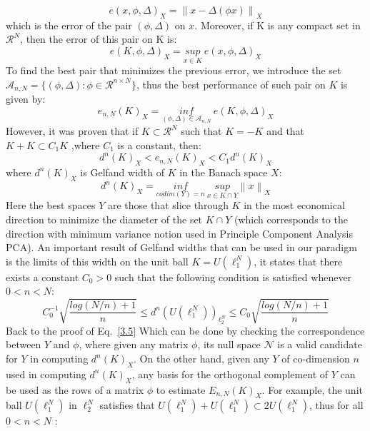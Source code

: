 \begin{equation}
    e(x,\phi,\Delta)_X=\left\| x-\Delta(\phi x)\right\|_X
\end{equation}
which is the error of the pair $(\phi, \Delta)$ on $x$. Moreover, if K is any compact set in $\mathcal{R}^N$, then the error of this pair on K is:
\begin{equation}
    e(K,\phi,\Delta)_X = \underset{x\in K}{sup} ~e(x,\phi,\Delta)_X
\end{equation}
To find the best pair that minimizes the previous error, we introduce the set $\mathcal{A}_{n,N}=\{(\phi, \Delta ): \phi \in \mathcal{R}^{n\times N}\}$, thus the best performance of such pair on $K$ is given by: 
\begin{equation}
e_{n,N}(K)_X= \underset{(\phi, \Delta)\in \mathcal{A}_{n,N}}{inf}~e(K,\phi,\Delta)_X
\end{equation}
However, it was proven that if $K\subset \mathcal{R}^N$ such that $K=-K$ and that $K+K\subset C_1K$ ,where $C_1$ is a constant, then\citep{concentration_kashin}:
\begin{equation}
\label{3.5}
   d^n(K)_X < e_{n,N}(K)_X<C_1d^n(K)_X
\end{equation}
where $d^n(K)_X$ is Gelfand width of $K$ in the Banach space $X$:
\begin{equation}
    d^n(K)_X= \underset{codim(Y)=n}{inf}~\underset{x\in K\cap Y}{sup}\left\|x\right\|_X
\end{equation}
Here the best spaces $Y$ are those that slice through $K$ in the most economical direction to minimize the diameter of the set $K\cap Y$ (which corresponds to the direction with minimum variance notion used in Principle Component Analysis PCA). An important result of Gelfand widths that can be used in our paradigm is the limits of this width on the unit ball $K=U(\ell_1^N)$, it states that there exists a constant $C_0>0$ such that the following condition is satisfied whenever $0< n< N $:
\begin{equation}
    C_0^{-1}\sqrt{\frac{log(N/n)+1}{n}}\leq d^n(U(\ell_1^N))_{\ell_2^N}\leq C_0\sqrt{\frac{log(N/n)+1}{n}}
\end{equation}
Back to the proof of Eq.~\ref{3.5} Which can be done by checking the correspondence between $Y$ and $\phi$, where given any matrix $\phi$, its null space $\mathcal{N}$ is a valid candidate for $Y$ in computing $d^n(K)_X$. On the other hand, given any $Y$ of co-dimension $n$ used in computing $d^n(K)_X$, any basis for the orthogonal complement of $Y$ can be used as the rows of a matrix $\phi$ to estimate $E_{n,N}(K)_X$. For example, the unit ball $U(\ell_1^N)$ in $\ell_2^N$ satisfies that $U(\ell_1^N)+U(\ell_1^N)\subset 2U(\ell_1^N)$, thus for all $0< n< N$ : 
